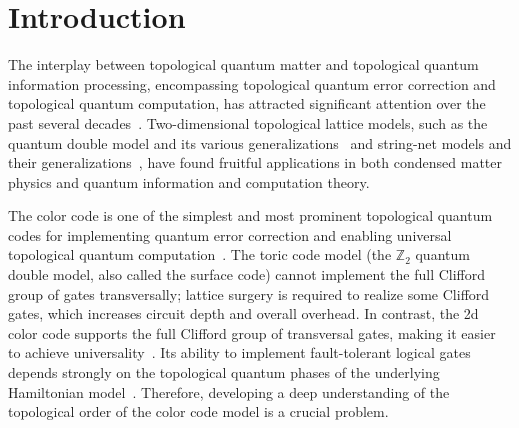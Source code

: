 \documentclass[a4paper,11pt]{article}
\theoremstyle{definition}
\theoremstyle{remark}
\theoremstyle{remark}
\begin{document}

\maketitle


\section{Introduction}

The interplay between topological quantum matter and topological quantum information processing, encompassing topological quantum error correction and topological quantum computation, has attracted significant attention over the past several decades~\cite{freedman2002modular,Kitaev2003}. Two-dimensional topological lattice models, such as the quantum double model and its various generalizations~\cite{Kitaev2003,Buerschaper2013a,jia2023boundary,Jia2023weak,jia2018efficient,chang2014kitaev,meusburger2017kitaev,Beigi2011the} and string-net models and their generalizations~\cite{Levin2005,Kitaev2012a,Hu2018full}, have found fruitful applications in both condensed matter physics and quantum information and computation theory.



The color code is one of the simplest and most prominent topological quantum codes for implementing quantum error correction and enabling universal topological quantum computation~\cite{Bombin2006colorcode,bombin2012universal,Kubica2015color,Kubica2015ColorCode}.  
The toric code model (the $\mathbb{Z}_2$ quantum double model, also called the surface code) cannot implement the full Clifford group of gates transversally; lattice surgery is required to realize some Clifford gates, which increases circuit depth and overall overhead.  
In contrast, the 2d color code supports the full Clifford group of transversal gates, making it easier to achieve universality~\cite{Bombin2006colorcode,bombin2012universal,Kubica2015color}.  
Its ability to implement fault-tolerant logical gates depends strongly on the topological quantum phases of the underlying Hamiltonian model~\cite{kesselring2024anyon,Kesselring2018boundaries}.  
Therefore, developing a deep understanding of the topological order of the color code model is a crucial problem.
\end{document}
